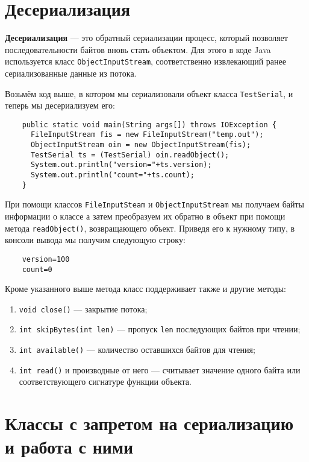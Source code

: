 \section{Десериализация}

\textbf{Десериализация} — это обратный сериализации процесс, который позволяет последовательности байтов вновь стать объектом. Для этого в коде Java используется класс \verb|ObjectInputStream|, соответственно извлекающий ранее сериализованные данные из потока.

Возьмём код выше, в котором мы сериализовали объект класса \verb|TestSerial|, и теперь мы десериализуем его:

\begin{lstlisting}
    public static void main(String args[]) throws IOException {
      FileInputStream fis = new FileInputStream("temp.out");
      ObjectInputStream oin = new ObjectInputStream(fis);
      TestSerial ts = (TestSerial) oin.readObject();
      System.out.println("version="+ts.version);
      System.out.println("count="+ts.count);
    }
\end{lstlisting}

При помощи классов \verb|FileInputSteam| и \verb|ObjectInputStream| мы получаем байты информации о классе а затем преобразуем их обратно в объект при помощи метода \verb|readObject()|, возвращающего объект. Приведя его к нужному типу, в консоли вывода мы получим следующую строку:

\begin{lstlisting}
    version=100
    count=0
\end{lstlisting}

Кроме указанного выше метода класс поддерживает также и другие методы:

\begin{enumerate}
    \item \verb|void close()| — закрытие потока;
    \item \verb|int skipBytes(int len)| — пропуск \verb|len| последующих байтов при чтении;
    \item \verb|int available()| — количество оставшихся байтов для чтения;
    \item \verb|int read()| и производные от него — считывает значение одного байта или соответствующего сигнатуре функции объекта.
\end{enumerate}

\section{Классы с запретом на сериализацию и работа с ними}

